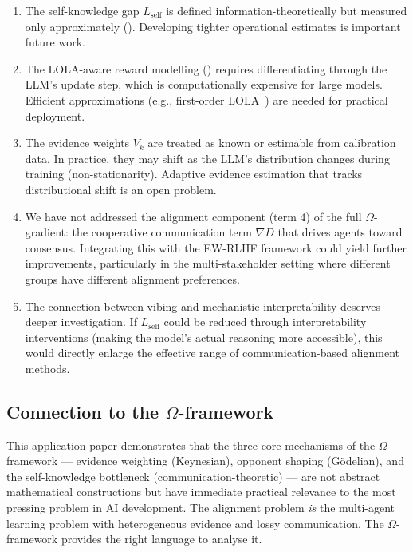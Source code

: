 \documentclass[11pt,a4paper]{article}
\begin{document}
\begin{enumerate}
    \item The self-knowledge gap $L_{\mathrm{self}}$ is defined information-theoretically but measured only approximately (). Developing tighter operational estimates is important future work.

    \item The LOLA-aware reward modelling () requires differentiating through the LLM's update step, which is computationally expensive for large models. Efficient approximations (e.g., first-order LOLA~\cite{foerster2018}) are needed for practical deployment.

    \item The evidence weights $V_k$ are treated as known or estimable from calibration data. In practice, they may shift as the LLM's distribution changes during training (non-stationarity). Adaptive evidence estimation that tracks distributional shift is an open problem.

    \item We have not addressed the alignment component (term 4) of the full $\Omega$-gradient: the cooperative communication term $\nabla D$ that drives agents toward consensus. Integrating this with the EW-RLHF framework could yield further improvements, particularly in the multi-stakeholder setting where different groups have different alignment preferences.

    \item The connection between vibing and mechanistic interpretability deserves deeper investigation. If $L_{\mathrm{self}}$ could be reduced through interpretability interventions (making the model's actual reasoning more accessible), this would directly enlarge the effective range of communication-based alignment methods.
\end{enumerate}

\subsection{Connection to the $\Omega$-framework}

This application paper demonstrates that the three core mechanisms of the $\Omega$-framework --- evidence weighting (Keynesian), opponent shaping (Gödelian), and the self-knowledge bottleneck (communication-theoretic) --- are not abstract mathematical constructions but have immediate practical relevance to the most pressing problem in AI development. The alignment problem \emph{is} the multi-agent learning problem with heterogeneous evidence and lossy communication. The $\Omega$-framework provides the right language to analyse it.
\end{document}
